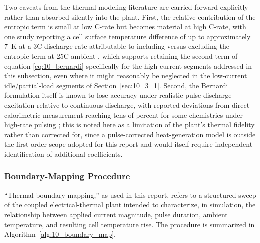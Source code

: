 Two caveats from the thermal-modeling literature are carried forward
explicitly rather than absorbed silently into the plant. First, the
relative contribution of the entropic term is small at low C-rate but
becomes material at high C-rate, with one study reporting a cell
surface temperature difference of up to approximately 7~K at a 3C
discharge rate attributable to including versus excluding the entropic
term at 25\textdegree C ambient \cite{chun2024_entropic}, which
supports retaining the second term of equation \eqref{eq:10_bernardi}
specifically for the high-current segments addressed in this
subsection, even where it might reasonably be neglected in the
low-current idle/partial-load segments of Section~\ref{sec:10_3_1}.
Second, the Bernardi formulation itself is known to lose accuracy
under realistic pulse-discharge excitation relative to continuous
discharge, with reported deviations from direct calorimetric
measurement reaching tens of percent for some chemistries under
high-rate pulsing \cite{bernardi_pulse_accuracy}; this is noted here
as a limitation of the plant's thermal fidelity rather than corrected
for, since a pulse-corrected heat-generation model is outside the
first-order scope adopted for this report and would itself require
independent identification of additional coefficients.

\subsubsection{Boundary-Mapping Procedure}

``Thermal boundary mapping,'' as used in this report, refers to a
structured sweep of the coupled electrical-thermal plant intended to
characterize, in simulation, the relationship between applied current
magnitude, pulse duration, ambient temperature, and resulting cell
temperature rise. The procedure is summarized in
Algorithm~\ref{alg:10_boundary_map}.

